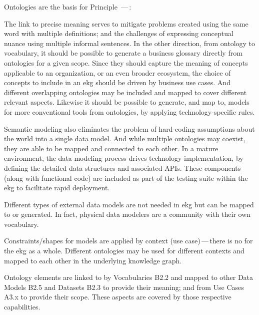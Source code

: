 Ontologies are the basis for Principle \,---\,:


The link to precise meaning serves to mitigate problems created using the same word with multiple definitions;
and the challenges of expressing conceptual nuance using multiple informal sentences.
In the other direction, from ontology to vocabulary, it should be possible to generate a business glossary
directly from ontologies for a given scope.
Since they should capture the meaning of concepts applicable to an organization, or an even broader ecosystem,
the choice of concepts to include in an \gls{ekg} should be driven by business use cases.
And different overlapping ontologies may be included and mapped to cover different relevant aspects.
Likewise it should be possible to generate, and map to, models for more conventional tools from ontologies,
by applying technology-specific rules.

Semantic modeling also eliminates the problem of hard-coding assumptions about the world into a single data model.
And while multiple ontologies may coexist, they are able to be mapped and connected to each other.
In a mature environment, the data modeling process drives technology implementation,
by defining the detailed data structures and associated APIs.
These components (along with functional code) are included as part of the testing suite within the \gls{ekg} to
facilitate rapid deployment.

Different types of external data models are not needed in \gls{ekg} but can be mapped to or generated.
In fact, physical data modelers are a community with their own vocabulary.

Constraints/shapes for models are applied by context (use case)\,---\,there is no 
for the \gls{ekg} as a whole.
Different ontologies may be used for different contexts and mapped to each other in the underlying knowledge graph.

Ontology elements are linked to by Vocabularies B2.2 and mapped to other Data Models B2.5 and Datasets B2.3 to
provide their meaning; and from Use Cases A3.x to provide their scope.
These aspects are covered by those respective capabilities.
